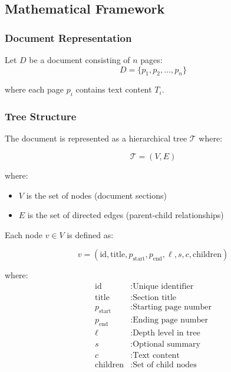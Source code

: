\documentclass[12pt,a4paper]{article}
\begin{document}
\subsection{Mathematical Framework}

\subsubsection{Document Representation}

Let $D$ be a document consisting of $n$ pages:
\begin{equation}
D = \{p_1, p_2, \ldots, p_n\}
\end{equation}

where each page $p_i$ contains text content $T_i$.

\subsubsection{Tree Structure}

The document is represented as a hierarchical tree $\mathcal{T}$ where:

\begin{equation}
\mathcal{T} = (V, E)
\end{equation}

where:
\begin{itemize}
    \item $V$ is the set of nodes (document sections)
    \item $E$ is the set of directed edges (parent-child relationships)
\end{itemize}

Each node $v \in V$ is defined as:

\begin{equation}
v = (\text{id}, \text{title}, p_{\text{start}}, p_{\text{end}}, \ell, s, c, \text{children})
\end{equation}

where:
\begin{align*}
\text{id} &: \text{Unique identifier} \\
\text{title} &: \text{Section title} \\
p_{\text{start}} &: \text{Starting page number} \\
p_{\text{end}} &: \text{Ending page number} \\
\ell &: \text{Depth level in tree} \\
s &: \text{Optional summary} \\
c &: \text{Text content} \\
\text{children} &: \text{Set of child nodes}
\end{align*}
\end{document}
